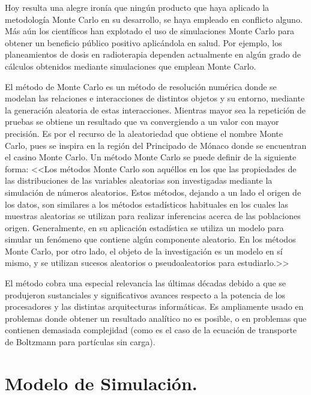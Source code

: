 \documentclass{rbf}
\begin{document}
Hoy resulta una alegre ironía que ningún producto que haya aplicado la metodología Monte Carlo en su desarrollo, se haya empleado en conflicto alguno. Más aún los científicos han explotado el uso de simulaciones Monte Carlo para obtener un beneficio público positivo aplicándola en salud. Por ejemplo, los planeamientos de dosis en radioterapia dependen actualmente en algún grado de cálculos obtenidos mediante simulaciones que emplean Monte Carlo.


El método de Monte Carlo es un método de resolución numérica donde se modelan las relaciones e interacciones de distintos objetos y su entorno, mediante la generación aleatoria de estas interacciones. Mientras mayor sea la repetición de pruebas se obtiene un resultado que va convergiendo a un valor con mayor precisión. Es por el recurso de la aleatoriedad que obtiene el nombre Monte Carlo, pues se inspira en la región del Principado de Mónaco donde se encuentran el casino Monte Carlo.
Un método Monte Carlo se puede definir de la siguiente forma: <<Los métodos Monte Carlo son aquéllos en los que las propiedades de las distribuciones de las variables aleatorias son investigadas mediante la simulación de números aleatorios. Estos métodos, dejando a un lado el origen de los datos, son similares a los métodos estadísticos habituales en los cuales las muestras aleatorias se utilizan para realizar inferencias acerca de las poblaciones origen. Generalmente, en su aplicación estadística se utiliza un modelo para simular un fenómeno que contiene algún componente aleatorio. En los métodos Monte Carlo, por otro lado, el objeto de la investigación es un modelo en sí mismo, y se utilizan sucesos aleatorios o pseudoaleatorios para estudiarlo.>>\cite{Gentle}


El método cobra una especial relevancia las
últimas décadas debido a que se produjeron
sustanciales y significativos avances respecto a la
potencia de los procesadores y las distintas
arquitecturas informáticas. Es ampliamente usado
en problemas donde obtener un resultado
analítico no es posible, o en problemas que
contienen demasiada complejidad (como es el
caso de la ecuación de transporte de Boltzmann
para partículas sin carga).\cite{Kling}



\section{Modelo de Simulación.}
\end{document}
